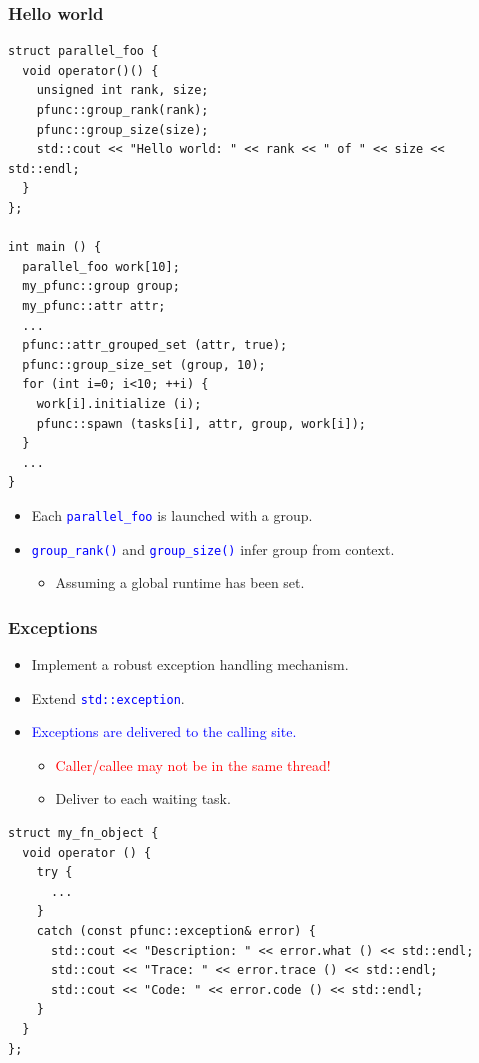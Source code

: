 \documentclass{beamer}
\newcommand{\code}[1]{\lstinline[basicstyle=\sffamily]{#1}}
\newcommand{\func}[1]{\lstinline[basicstyle=\sffamily]{#1()}}
\begin{document}
\begin{frame}[fragile]
\frametitle{Hello world}
\begin{center}
\begin{minipage}{0.55\textwidth}
\begin{lstlisting}
struct parallel_foo {
  void operator()() {
    unsigned int rank, size;
    pfunc::group_rank(rank);
    pfunc::group_size(size);
    std::cout << "Hello world: " << rank << " of " << size << std::endl;
  }
};

int main () {
  parallel_foo work[10];
  my_pfunc::group group;
  my_pfunc::attr attr;
  ...
  pfunc::attr_grouped_set (attr, true);
  pfunc::group_size_set (group, 10);
  for (int i=0; i<10; ++i) {
    work[i].initialize (i);
    pfunc::spawn (tasks[i], attr, group, work[i]);
  }
  ...
}
\end{lstlisting}
\end{minipage}
\end{center}
\begin{itemize}
\item Each \textcolor{blue}{\code{parallel_foo}} is launched with a group.
\item \textcolor{blue}{\func{group_rank}} and \textcolor{blue}{\func{group_size}} infer group from context.
  \begin{itemize}
  \item Assuming a global runtime has been set.
  \end{itemize}
\end{itemize}
\end{frame}

\begin{frame}[fragile]
\frametitle{Exceptions}
\begin{itemize}
\item Implement a robust exception handling mechanism.
\item Extend \textcolor{blue}{\code{std::exception}}.
\item \textcolor{blue}{Exceptions are delivered to the calling site.}
  \begin{itemize}
  \item \textcolor{red}{Caller/callee may not be in the same thread!}
  \item Deliver to each waiting task.
  \end{itemize}
\end{itemize}
\begin{center}
\begin{minipage}{0.60\textwidth}
\begin{lstlisting}
struct my_fn_object { 
  void operator () { 
    try { 
      ... 
    }
    catch (const pfunc::exception& error) { 
      std::cout << "Description: " << error.what () << std::endl;
      std::cout << "Trace: " << error.trace () << std::endl; 
      std::cout << "Code: " << error.code () << std::endl;
    } 
  }
};
\end{lstlisting}
\end{minipage}
\end{center}
\end{frame}
\end{document}
